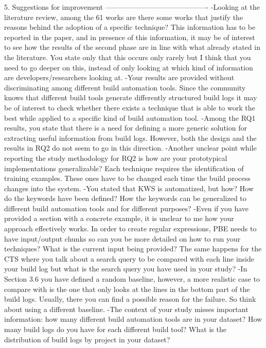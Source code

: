 \documentclass[10pt,a4wide]{article}
\renewenvironment{leftbar}{%
	\vspace{0.1cm}
	\def\FrameCommand{\vrule width 0.4pt \hspace{15pt}}%
	\MakeFramed {\advance\hsize-\width \FrameRestore}}%
{\endMakeFramed\vspace{0.1cm}}
\begin{document}
\begin{leftbar}
5. Suggestions for improvement
-------------------------------------------
-Looking at the literature review, among the 61 works are there some works that justify the reasons behind the adoption of a specific technique? This information has to be reported in the paper, and in presence of this information, it may be of interest to see how the results of the second phase are in line with what already stated in the literature. You state only that this occurs only rarely but I think that you need to go deeper on this, instead of only looking at which kind of information are developers/researchers looking at.
-Your results are provided without discriminating among different build automation tools. Since the community knows that different build tools generate differently structured build logs it may be of interest to check whether there exists a technique that is able to work the best while applied to a specific kind of build automation tool.
-Among the RQ1 results, you state that there is a need for defining a more generic solution for extracting useful information from build logs. However, both the design and the results in RQ2 do not seem to go in this direction.
-Another unclear point while reporting the study methodology for RQ2 is how are your prototypical implementations generalizable? Each technique requires the identification of training examples. These ones have to be changed each time the build process changes into the system.
-You stated that KWS is automatized, but how? How do the keywords have been defined? How the keywords can be generalized to different build automation tools and for different purposes?
-Even if you have provided a section with a concrete example, it is unclear to me how your approach effectively works. In order to create regular expressions, PBE needs to have input/output chunks so can you be more detailed on how to run your techniques? What is the current input being provided? The same happens for the CTS where you talk about a search query to be compared with each line inside your build log but what is the search query you have used in your study?
-In Section 3.6 you have defined a random baseline, however, a more realistic case to compare with is the one that only looks at the lines in the bottom part of the build logs. Usually, there you can find a possible reason for the failure. So think about using a different baseline.
-The context of your study misses important information: how many different build automation tools are in your dataset? How many build logs do you have for each different build tool? What is the distribution of build logs by project in your dataset?

\end{leftbar}
\end{document}
